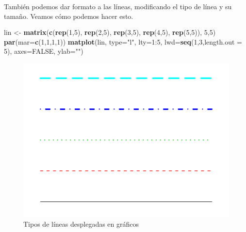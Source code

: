 \documentclass[]{article}
\newenvironment{Shaded}{\begin{snugshade}}{\end{snugshade}}
\newcommand{\KeywordTok}[1]{\textcolor[rgb]{0.13,0.29,0.53}{\textbf{{#1}}}}
\newcommand{\DataTypeTok}[1]{\textcolor[rgb]{0.13,0.29,0.53}{{#1}}}
\newcommand{\DecValTok}[1]{\textcolor[rgb]{0.00,0.00,0.81}{{#1}}}
\newcommand{\StringTok}[1]{\textcolor[rgb]{0.31,0.60,0.02}{{#1}}}
\newcommand{\OtherTok}[1]{\textcolor[rgb]{0.56,0.35,0.01}{{#1}}}
\newcommand{\NormalTok}[1]{{#1}}
\begin{document}
También podemos dar formato a las líneas, modificando el tipo de línea y
su tamaño. Veamos cómo podemos hacer esto.

\begin{Shaded}
\begin{Highlighting}[]
\NormalTok{lin <-}\StringTok{ }\KeywordTok{matrix}\NormalTok{(}\KeywordTok{c}\NormalTok{(}\KeywordTok{rep}\NormalTok{(}\DecValTok{1}\NormalTok{,}\DecValTok{5}\NormalTok{), }\KeywordTok{rep}\NormalTok{(}\DecValTok{2}\NormalTok{,}\DecValTok{5}\NormalTok{), }\KeywordTok{rep}\NormalTok{(}\DecValTok{3}\NormalTok{,}\DecValTok{5}\NormalTok{), }\KeywordTok{rep}\NormalTok{(}\DecValTok{4}\NormalTok{,}\DecValTok{5}\NormalTok{), }\KeywordTok{rep}\NormalTok{(}\DecValTok{5}\NormalTok{,}\DecValTok{5}\NormalTok{)), }\DecValTok{5}\NormalTok{,}\DecValTok{5}\NormalTok{) }
\KeywordTok{par}\NormalTok{(}\DataTypeTok{mar=}\KeywordTok{c}\NormalTok{(}\DecValTok{1}\NormalTok{,}\DecValTok{1}\NormalTok{,}\DecValTok{1}\NormalTok{,}\DecValTok{1}\NormalTok{))}
\KeywordTok{matplot}\NormalTok{(lin, }\DataTypeTok{type=}\StringTok{"l"}\NormalTok{, }\DataTypeTok{lty=}\DecValTok{1}\NormalTok{:}\DecValTok{5}\NormalTok{, }\DataTypeTok{lwd=}\KeywordTok{seq}\NormalTok{(}\DecValTok{1}\NormalTok{,}\DecValTok{3}\NormalTok{,}\DataTypeTok{length.out =} \DecValTok{5}\NormalTok{),}
        \DataTypeTok{axes=}\OtherTok{FALSE}\NormalTok{, }\DataTypeTok{ylab=}\StringTok{""}\NormalTok{)}
\end{Highlighting}
\end{Shaded}

\begin{figure}

{\centering \includegraphics{index_files/figure-latex/unnamed-chunk-8-1} 

}

\caption{Tipos de líneas desplegadas en gráficos}\label{fig:unnamed-chunk-8}
\end{figure}
\end{document}

